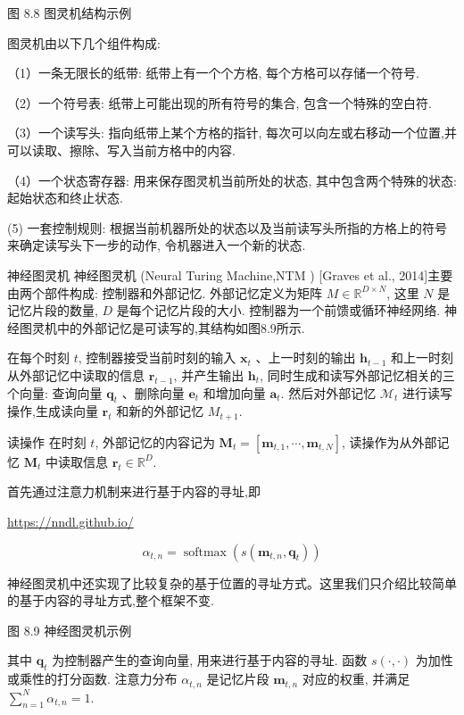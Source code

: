 \documentclass[10pt]{article}
\begin{document}
图 8.8 图灵机结构示例

图灵机由以下几个组件构成:

（1）一条无限长的纸带: 纸带上有一个个方格, 每个方格可以存储一个符号.

（2）一个符号表: 纸带上可能出现的所有符号的集合, 包含一个特殊的空白符.

（3）一个读写头: 指向纸带上某个方格的指针, 每次可以向左或右移动一个位置,并可以读取、擦除、写入当前方格中的内容.

（4）一个状态寄存器: 用来保存图灵机当前所处的状态, 其中包含两个特殊的状态: 起始状态和终止状态.

(5) 一套控制规则: 根据当前机器所处的状态以及当前读写头所指的方格上的符号来确定读写头下一步的动作, 令机器进入一个新的状态.

神经图灵机 神经图灵机 (Neural Turing Machine,NTM ) [Graves et al., 2014]主要由两个部件构成: 控制器和外部记忆. 外部记忆定义为矩阵 $M \in \mathbb{R}^{D \times N}$, 这里 $N$ 是记忆片段的数量, $D$ 是每个记忆片段的大小. 控制器为一个前馈或循环神经网络. 神经图灵机中的外部记忆是可读写的,其结构如图8.9所示.

在每个时刻 $t$, 控制器接受当前时刻的输入 $\boldsymbol{x}_{t}$ 、上一时刻的输出 $\boldsymbol{h}_{t-1}$ 和上一时刻从外部记忆中读取的信息 $\boldsymbol{r}_{t-1}$, 并产生输出 $\boldsymbol{h}_{t}$, 同时生成和读写外部记忆相关的三个向量: 查询向量 $\boldsymbol{q}_{t}$ 、删除向量 $\boldsymbol{e}_{t}$ 和增加向量 $\boldsymbol{a}_{t}$. 然后对外部记忆 $\mathcal{M}_{t}$ 进行读写操作,生成读向量 $\boldsymbol{r}_{t}$ 和新的外部记忆 $M_{t+1}$.

读操作 在时刻 $t$, 外部记忆的内容记为 $\boldsymbol{M}_{t}=\left[\boldsymbol{m}_{t, 1}, \cdots, \boldsymbol{m}_{t, N}\right]$, 读操作为从外部记忆 $\boldsymbol{M}_{t}$ 中读取信息 $\boldsymbol{r}_{t} \in \mathbb{R}^{D}$.

首先通过注意力机制来进行基于内容的寻址,即

\href{https://nndl.github.io/}{https://nndl.github.io/}


\begin{equation*}
\alpha_{t, n}=\operatorname{softmax}\left(s\left(\boldsymbol{m}_{t, n}, \boldsymbol{q}_{t}\right)\right) \tag{8.29}
\end{equation*}


神经图灵机中还实现了比较复杂的基于位置的寻址方式。这里我们只介绍比较简单的基于内容的寻址方式,整个框架不变.



图 8.9 神经图灵机示例

其中 $\boldsymbol{q}_{t}$ 为控制器产生的查询向量, 用来进行基于内容的寻址. 函数 $s(\cdot, \cdot)$ 为加性或乘性的打分函数. 注意力分布 $\alpha_{t, n}$ 是记忆片段 $\boldsymbol{m}_{t, n}$ 对应的权重, 并满足 $\sum_{n=1}^{N} \alpha_{t, n}=1$.
\end{document}
